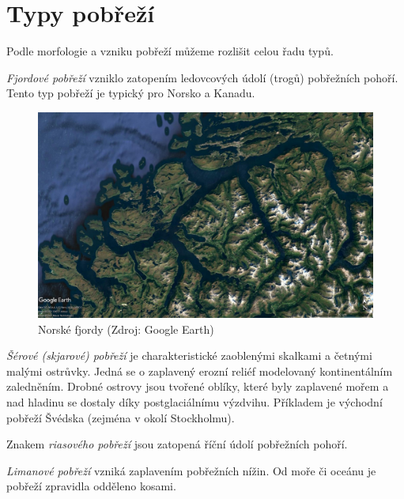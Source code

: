 \section{Typy pobřeží}
Podle morfologie a vzniku pobřeží můžeme rozlišit celou řadu typů. 

\emph{Fjordové pobřeží} vzniklo zatopením ledovcových údolí (trogů) pobřežních pohoří. Tento typ pobřeží je typický pro Norsko a Kanadu. 

\begin{figure}[h]
	\centering
	\includegraphics[width=1\linewidth]{obrazky/marine/fjord}
	\caption{Norské fjordy (Zdroj: Google Earth)}
	\label{fig:fjord}
\end{figure}


\emph{Šérové (skjarové) pobřeží}  je charakteristické zaoblenými skalkami a četnými malými ostrůvky. Jedná se o zaplavený erozní reliéf modelovaný kontinentálním zaledněním. Drobné ostrovy jsou tvořené oblíky, které byly zaplavené mořem a nad hladinu se dostaly díky postglaciálnímu výzdvihu. Příkladem je východní pobřeží Švédska (zejména v okolí Stockholmu).

Znakem \emph{riasového pobřeží} jsou zatopená říční údolí pobřežních pohoří.

\emph{Limanové pobřeží} vzniká zaplavením pobřežních nížin. Od moře či oceánu je pobřeží zpravidla odděleno kosami.

